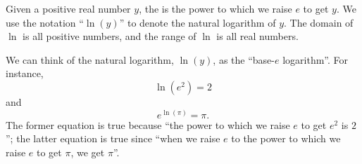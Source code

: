 \documentclass[nooutcomes]{ximera}
\begin{document}
\begin{definition}
Given a positive real number \(y\), the  is the power to which we raise \(e\) to get \(y\).  We use the notation ``\(\ln(y)\)'' to denote the natural logarithm of \(y\). The domain of $\ln$ is all positive numbers, and the range of $\ln$ is all real numbers. 
\end{definition}

We can think of the natural logarithm, \(\ln(y)\), as the ``base-\(e\) logarithm''.  For instance,%
\begin{equation*}
\ln(e^2) = 2
\end{equation*}
and%
\begin{equation*}
e^{\ln(\pi)} = \pi\text{.}
\end{equation*}
The former equation is true because ``the power to which we raise \(e\) to get \(e^2\) is \(2\)''; the latter equation is true since ``when we raise \(e\) to the power to which we raise \(e\) to get \(\pi\), we get \(\pi\)''.
\end{document}
